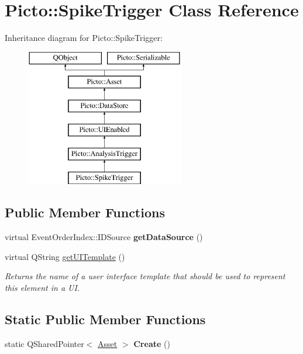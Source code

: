 \hypertarget{class_picto_1_1_spike_trigger}{\section{Picto\-:\-:Spike\-Trigger Class Reference}
\label{class_picto_1_1_spike_trigger}
}
Inheritance diagram for Picto\-:\-:Spike\-Trigger\-:\begin{figure}[H]
\begin{center}
\leavevmode
\includegraphics[height=6.000000cm]{class_picto_1_1_spike_trigger}
\end{center}
\end{figure}
\subsection*{Public Member Functions}
\begin{DoxyCompactItemize}
\item 
\hypertarget{class_picto_1_1_spike_trigger_a616aa8ba346e681886549855b86f1694}{virtual Event\-Order\-Index\-::\-I\-D\-Source {\bfseries get\-Data\-Source} ()}\label{class_picto_1_1_spike_trigger_a616aa8ba346e681886549855b86f1694}

\item 
\hypertarget{class_picto_1_1_spike_trigger_ace8a8b42c7661f30f291bdeee4ff7054}{virtual Q\-String \hyperlink{class_picto_1_1_spike_trigger_ace8a8b42c7661f30f291bdeee4ff7054}{get\-U\-I\-Template} ()}\label{class_picto_1_1_spike_trigger_ace8a8b42c7661f30f291bdeee4ff7054}

\begin{DoxyCompactList}\small\item\em Returns the name of a user interface template that should be used to represent this element in a U\-I. \end{DoxyCompactList}\end{DoxyCompactItemize}
\subsection*{Static Public Member Functions}
\begin{DoxyCompactItemize}
\item 
\hypertarget{class_picto_1_1_spike_trigger_a2813bc59e38fb1c8a1d1785e078c13ce}{static Q\-Shared\-Pointer$<$ \hyperlink{class_picto_1_1_asset}{Asset} $>$ {\bfseries Create} ()}\label{class_picto_1_1_spike_trigger_a2813bc59e38fb1c8a1d1785e078c13ce}

\end{DoxyCompactItemize}
